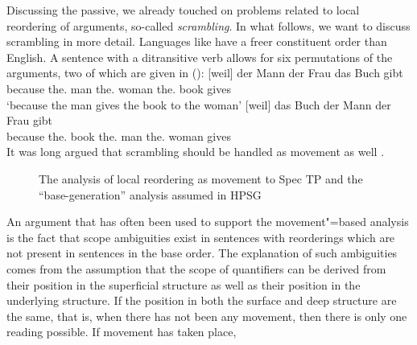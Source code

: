 \documentclass[output=paper
                ,modfonts
                ,nonflat
	        ,collection
	        ,collectionchapter
	        ,collectiontoclongg
 	        ,biblatex
                ,babelshorthands
                ,newtxmath
                ,draftmode
                ,colorlinks, citecolor=brown
]{./langsci/langscibook}
\begin{document}
Discussing the passive, we already touched on problems related to local reordering of arguments,
so-called \emph{scrambling}. In what follows, we want
to discuss scrambling in more detail. Languages like  have a freer constituent
order than English. A sentence with a ditransitive verb allows for six permutations of
the arguments, two of which are given in ():
\eal
\label{ex-gb-umstellung}
\ex 
\gll {}[weil] der Mann der Frau das Buch gibt\\
     \spacebr{}because the.\nom{} man the.\dat{} woman the.\acc{} book gives\\
\glt `because the man gives the book to the woman'
\ex\label{ex-das-buch-der-mann-der-frau-gibt} 
\gll {}[weil] das Buch der Mann der Frau gibt\\
     \spacebr{}because the.\acc{} book the.\nom{} man the.\dat{} woman gives\\
\zl
It was long argued that scrambling should be handled as movement as well \citep{Frey93a}.
\begin{figure}
\hfill
{}
\caption{The analysis of local reordering as movement to Spec TP and the ``base-generation'' analysis
  assumed in HPSG}\label{fig-das-buch-der-mann-der-frau-gibt-movement}
\end{figure}%
%
An argument that has often been used to support the movement"=based analysis is the fact that scope ambiguities
exist in sentences with reorderings which are not present in sentences in the base order. The
explanation of such ambiguities comes from the assumption that the scope of quantifiers can be
derived from their position in the superficial structure as well as their position in the underlying
structure. If the position in both the surface and deep structure are the same, that is, when there
has not been any movement, then there is only one reading possible. If movement has taken place,
\end{document}
